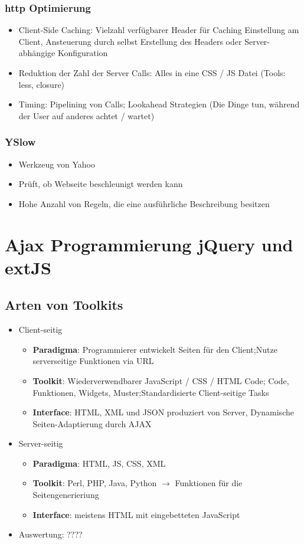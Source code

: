 \documentclass{article} %
\begin{document}
	\subsubsection{http Optimierung}
	\begin{itemize}
		\item Client-Side Caching: Vielzahl verfügbarer Header für Caching Einstellung am Client, Ansteuerung durch selbst Erstellung des Headers oder Server-abhängige Konfiguration
		\item Reduktion der Zahl der Server Calls: Alles in eine CSS / JS Datei (Tools: less, closure)
		\item Timing: Pipelining von Calls; Lookahead Strategien (Die Dinge tun, während der User auf anderes achtet / wartet)
	\end{itemize}
	\subsubsection{YSlow}
	\begin{itemize}
		\item Werkzeug von Yahoo
		\item Prüft, ob Webseite beschleunigt werden kann
		\item Hohe Anzahl von Regeln, die eine ausführliche Beschreibung besitzen
	\end{itemize}
\section{Ajax Programmierung jQuery und extJS}
	\subsection{Arten von Toolkits}
	\begin{itemize}
		\item Client-seitig
			\begin{itemize}
				\item \textbf{Paradigma}: Programmierer entwickelt Seiten für den Client;Nutze serverseitige Funktionen via URL
				\item \textbf{Toolkit}: Wiederverwendbarer JavaScript / CSS / HTML Code; Code, Funktionen, Widgets, Muster;Standardisierte Client-seitige Tasks
				\item \textbf{Interface}: HTML, XML und JSON produziert von Server, Dynamische Seiten-Adaptierung durch AJAX
			\end{itemize}
		\item Server-seitig
			\begin{itemize}
				\item \textbf{Paradigma}: HTML, JS, CSS, XML
				\item \textbf{Toolkit}: Perl, PHP, Java, Python $\rightarrow$ Funktionen für die Seitengenerieriung
				\item \textbf{Interface}: meistens HTML mit eingebetteten JavaScript
			\end{itemize}
		\item Auswertung: ????
	\end{itemize}		
\end{document}
